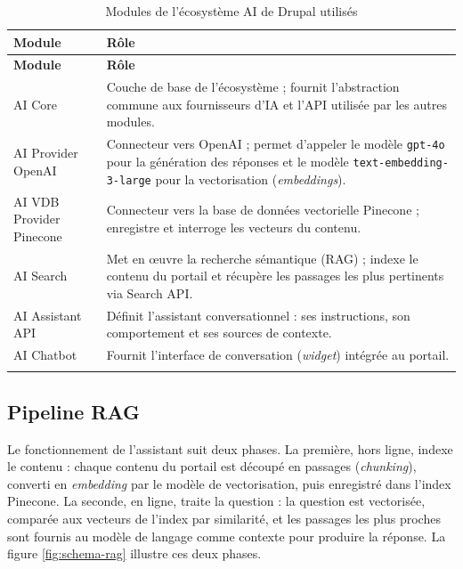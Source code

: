 \begin{longtable}{|p{4.5cm}|p{10.5cm}|}

\hline
\rowcolor{orange!30}
\textbf{Module} & \textbf{Rôle} \\ \hline
\endfirsthead

\hline
\rowcolor{orange!30}
\textbf{Module} & \textbf{Rôle} \\ \hline
\endhead


AI Core & 
Couche de base de l'écosystème ; fournit l'abstraction commune aux fournisseurs d'IA et l'API utilisée par les autres modules. 
\\ \hline

AI Provider OpenAI & 
Connecteur vers OpenAI ; permet d'appeler le modèle \texttt{gpt-4o} pour la génération des réponses et le modèle \texttt{text-embedding-3-large} pour la vectorisation (\textit{embeddings}). 
\\ \hline

AI VDB Provider Pinecone & 
Connecteur vers la base de données vectorielle Pinecone ; enregistre et interroge les vecteurs du contenu. 
\\ \hline

AI Search & 
Met en œuvre la recherche sémantique (RAG) ; indexe le contenu du portail et récupère les passages les plus pertinents via Search API. 
\\ \hline

AI Assistant API & 
Définit l'assistant conversationnel : ses instructions, son comportement et ses sources de contexte. 
\\ \hline

AI Chatbot & 
Fournit l'interface de conversation (\textit{widget}) intégrée au portail. 
\\ \hline


\caption{Modules de l'écosystème AI de Drupal utilisés}
\label{tab:modules-ai}

\end{longtable}

\subsection{Pipeline RAG}
\noindent Le fonctionnement de l'assistant suit deux phases. La première, hors ligne, indexe le contenu : chaque contenu du portail est découpé en passages (\textit{chunking}), converti en \textit{embedding} par le modèle de vectorisation, puis enregistré dans l'index Pinecone. La seconde, en ligne, traite la question : la question est vectorisée, comparée aux vecteurs de l'index par similarité, et les passages les plus proches sont fournis au modèle de langage comme contexte pour produire la réponse. La figure \ref{fig:schema-rag} illustre ces deux phases.

